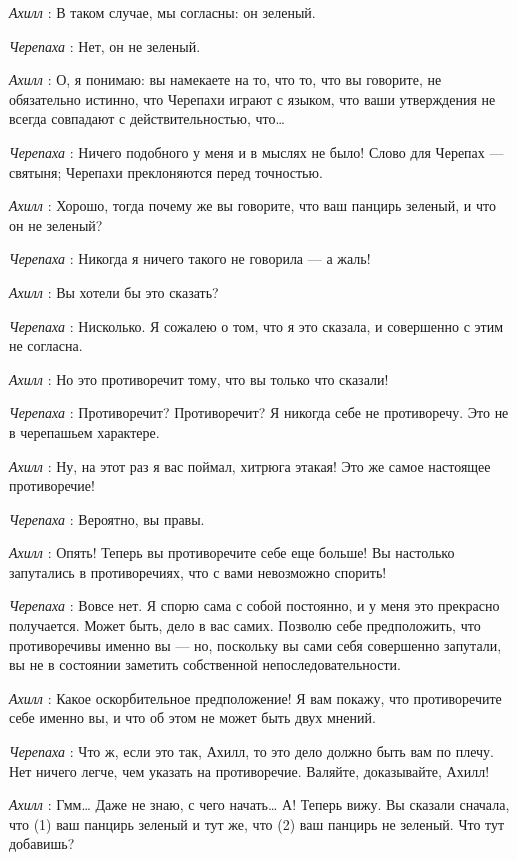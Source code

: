 \emph{Ахилл} : В таком случае, мы согласны: он зеленый.

\emph{Черепаха} : Нет, он не зеленый.

\emph{Ахилл} : О, я понимаю: вы намекаете на то, что то, что вы говорите, не обязательно истинно, что Черепахи играют с языком, что ваши утверждения не всегда совпадают с действительностью, что\ldots{}

\emph{Черепаха} : Ничего подобного у меня и в мыслях не было! Слово для Черепах --- святыня; Черепахи преклоняются перед точностью.

\emph{Ахилл} : Хорошо, тогда почему же вы говорите, что ваш панцирь зеленый, и что он не зеленый?

\emph{Черепаха} : Никогда я ничего такого не говорила --- а жаль!

\emph{Ахилл} : Вы хотели бы это сказать?

\emph{Черепаха} : Нисколько. Я сожалею о том, что я это сказала, и совершенно с этим не согласна.

\emph{Ахилл} : Но это противоречит тому, что вы только что сказали!

\emph{Черепаха} : Противоречит? Противоречит? Я никогда себе не противоречу. Это не в черепашьем характере.

\emph{Ахилл} : Ну, на этот раз я вас поймал, хитрюга этакая! Это же самое настоящее противоречие!

\emph{Черепаха} : Вероятно, вы правы.

\emph{Ахилл} : Опять! Теперь вы противоречите себе еще больше! Вы настолько запутались в противоречиях, что с вами невозможно спорить!

\emph{Черепаха} : Вовсе нет. Я спорю сама с собой постоянно, и у меня это прекрасно получается. Может быть, дело в вас самих. Позволю себе предположить, что противоречивы именно вы --- но, поскольку вы сами себя совершенно запутали, вы не в состоянии заметить собственной непоследовательности.

\emph{Ахилл} : Какое оскорбительное предположение! Я вам покажу, что противоречите себе именно вы, и что об этом не может быть двух мнений.

\emph{Черепаха} : Что ж, если это так, Ахилл, то это дело должно быть вам по плечу. Нет ничего легче, чем указать на противоречие. Валяйте, доказывайте, Ахилл!

\emph{Ахилл} : Гмм\ldots{} Даже не знаю, с чего начать\ldots{} А! Теперь вижу. Вы сказали сначала, что (1) ваш панцирь зеленый и тут же, что (2) ваш панцирь не зеленый. Что тут добавишь?

